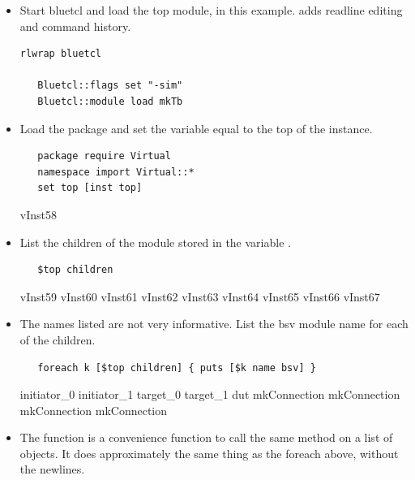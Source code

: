 

                   

\begin{itemize}
\item Start bluetcl and load the top module,   in this example.   adds
readline editing and command history.  

\begin{verbatim}
rlwrap bluetcl

   Bluetcl::flags set "-sim"
   Bluetcl::module load mkTb
\end{verbatim}

\item Load the  package and set the variable 
equal to the top of the instance.

\begin{verbatim}
   package require Virtual
   namespace import Virtual::*
   set top [inst top]
\end{verbatim}
\begin{codebox}
vInst58
\end{codebox}

\item List the children of  the module stored in the variable
.

\begin{verbatim}
   $top children
\end{verbatim}
\begin{codebox}
vInst59 vInst60 vInst61 vInst62 vInst63 vInst64 vInst65 vInst66 vInst67
\end{codebox}

\item The names listed are not very informative.  List the bsv
module name for each of the children.  

\begin{verbatim}
   foreach k [$top children] { puts [$k name bsv] }
\end{verbatim}
\begin{codebox}
initiator_0
initiator_1
target_0
target_1
dut
mkConnection
mkConnection
mkConnection
mkConnection
\end{codebox}

\item The  function is a convenience function to
call the same method on a list of objects.  It does approximately the
same thing as the foreach above, without  the newlines.


\end{itemize}
